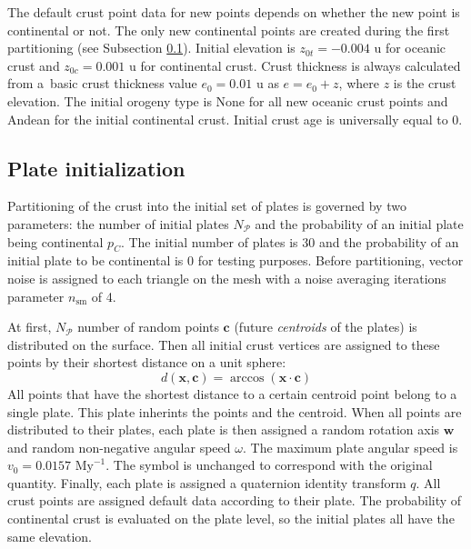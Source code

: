 The default crust point data for new points depends on whether the new point is continental or not. The only new continental points are created during the first partitioning (see Subsection \ref{subsec:plate-initialization}). Initial elevation is $z_{0t}=-0.004 \mbox{ u}$ for oceanic crust and $z_{0c}=0.001 \mbox{ u}$ for continental crust. Crust thickness is always calculated from a~basic crust thickness value $e_0=0.01\mbox{ u}$ as $e=e_0+z$, where $z$ is the crust elevation. The initial orogeny type is None for all new oceanic crust points and Andean for the initial continental crust. Initial crust age is universally equal to 0.
\subsection{Plate initialization}
\label{subsec:plate-initialization}
Partitioning of the crust into the initial set of plates  is governed by two parameters: the number of initial plates $N_\mathcal{P}$ and the probability of an initial plate being continental $p_C$. The initial number of plates is 30 and the probability of an initial plate to be continental is 0 for testing purposes. Before partitioning, vector noise is assigned to each triangle on the mesh with a noise averaging iterations parameter $n_{\mbox{sm}}$ of 4.

At first, $N_\mathcal{P}$ number of random points $\mathbf{c}$ (future \textit{centroids} of the plates) is distributed on the surface. Then all initial crust vertices are assigned to these points by their shortest distance on a unit sphere:
$$d(\mathbf{x},\mathbf{c})=\arccos(\mathbf{x}\cdot\mathbf{c})$$
All points that have the shortest distance to a certain centroid point belong to a single plate. This plate inherints the points and the centroid. When all points are distributed to their plates, each plate is then assigned a random rotation axis $\mathbf{w}$ and random non-negative angular speed $\omega$. The maximum plate angular speed is $v_0=0.0157\mbox{ My}^{-1}$. The symbol is unchanged to correspond with the original quantity. Finally, each plate is assigned a quaternion identity transform $q$. All crust points are assigned default data according to their plate. The probability of continental crust is evaluated on the plate level, so the initial plates all have the same elevation.

